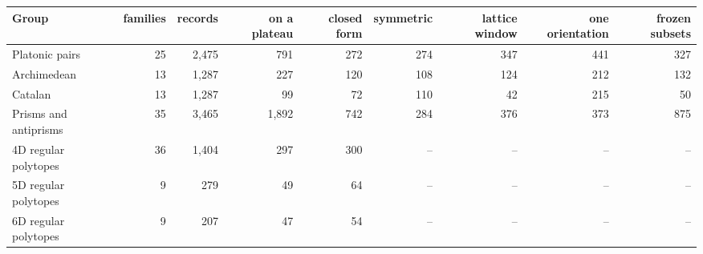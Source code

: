 \begin{tabular}{lrrrrrrrr}
\toprule
Group & families & records & on a plateau & closed form & symmetric & lattice window & one orientation & frozen subsets \\
\midrule
Platonic pairs & 25 & 2,475 & 791 & 272 & 274 & 347 & 441 & 327 \\
Archimedean & 13 & 1,287 & 227 & 120 & 108 & 124 & 212 & 132 \\
Catalan & 13 & 1,287 & 99 & 72 & 110 & 42 & 215 & 50 \\
Prisms and antiprisms & 35 & 3,465 & 1,892 & 742 & 284 & 376 & 373 & 875 \\
4D regular polytopes & 36 & 1,404 & 297 & 300 & -- & -- & -- & -- \\
5D regular polytopes & 9 & 279 & 49 & 64 & -- & -- & -- & -- \\
6D regular polytopes & 9 & 207 & 47 & 54 & -- & -- & -- & -- \\
\bottomrule
\end{tabular}
